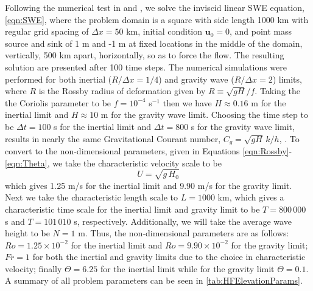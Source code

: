   Following the numerical test in \cite{Hanert2002} and \cite{Batteen1981}, we
  solve the inviscid linear SWE equation, \eqref{eqn:SWE}, where the problem
  domain is a square with side length 1000 km with regular grid spacing of
  $\Delta x=50$ km, initial condition $\mathbf{u}_0 = 0$, and point mass source and
  sink of 1 m and -1 m at fixed locations in the middle of the domain,
  vertically, 500 km apart, horizontally, so as to force the flow.  The
  resulting solution are presented after 100 time steps. The numerical
  simulations were performed for both inertial ($R/\Delta x = 1/4$) and gravity wave
  ($R/\Delta x = 2$) limits, where $R$ is the Rossby radius of deformation given by $R
  \equiv \sqrt{gH}/f$. Taking the the Coriolis parameter to be $f = 10^{-4}$
  s$^{-1}$ then we have $H \approx 0.16$ m for the inertial limit and $H \approx
  10$ m for the gravity wave limit. Choosing the time step to be $\Delta t = 100$ s for the inertial limit
  and $\Delta t = 800$ s for the gravity wave limit, results in nearly the same
  Gravitational Courant number, $C_g = \sqrt{gH}\,k/h$, \cite{Le-Roux1998}. To
  convert to the non-dimensional parameters, given in Equations
  \ref{eqn:Rossby}-\ref{eqn:Theta}, we take the characteristic velocity scale to
  be 
  \begin{equation}
    U = \sqrt{g\,H_0}
    \label{eqn:VelocityScale}
  \end{equation}
  which gives 1.25 m/s for the inertial limit and 9.90 m/s for the gravity limit.
  Next we take the characteristic length scale to $L = 1000$ km, which gives a
  characteristic time scale for the inertial limit and gravity limit to be
  $T=800\,000$ s and $T=101\,010$ s, respectively. Additionally, we will take the
  average wave height to be $N=1$ m. Thus, the non-dimensional parameters are as
  follows: $Ro = 1.25\times10^{-2}$ for the inertial limit and
  $Ro=9.90\times10^{-2}$ for the gravity limit; $Fr = 1$ for both the inertial
  and gravity limits due to the choice in characteristic velocity;
  finally $\Theta = 6.25$ for the inertial limit while for the gravity limit
  $\Theta = 0.1$. A summary of all problem parameters can be seen in
  \autoref{tab:HFElevationParams}.

